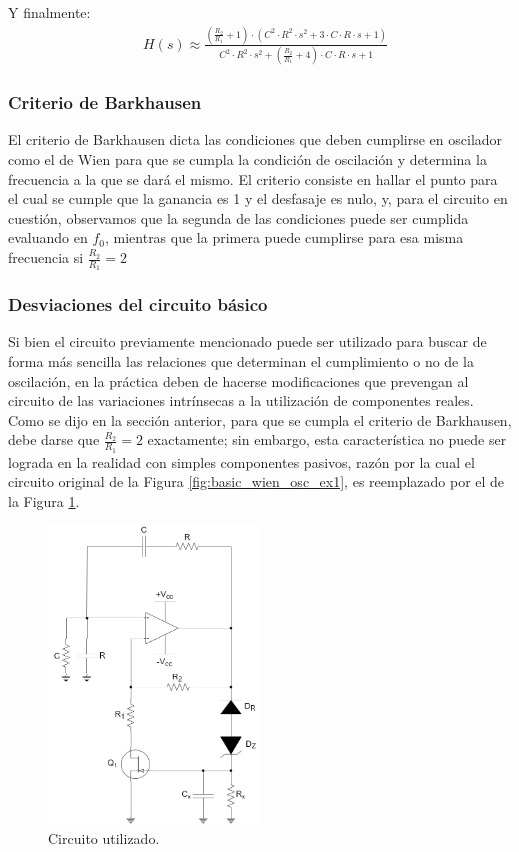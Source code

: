 Y finalmente:
\begin{align}
    & H(s) \approx \frac{\left(\frac{R_2}{R_1} + 1\right) \cdot \left(C^2 \cdot R^2 \cdot s^2 + 3 \cdot C \cdot R \cdot s + 1\right)}
    {C^2 \cdot R^2 \cdot s^2 + \left(\frac{R_2}{R_1} + 4\right) \cdot C \cdot R \cdot s + 1}
    \label{eq:transference_ex1}
\end{align}


\subsubsection{Criterio de Barkhausen}
El criterio de Barkhausen dicta las condiciones que deben cumplirse en oscilador como el de Wien para que se cumpla la condición de oscilación y determina la frecuencia a 
la que se dará el mismo.
El criterio consiste en hallar el punto para el cual se cumple que la ganancia es 1 y el desfasaje es nulo, y, para el circuito en cuestión, observamos que la segunda de 
las condiciones puede ser cumplida evaluando en $f_0$, mientras que la primera puede cumplirse para esa misma frecuencia si $\frac{R_2}{R_1} = 2$


\subsubsection{Desviaciones del circuito básico}
Si bien el circuito previamente mencionado puede ser utilizado para buscar de forma más sencilla las relaciones que determinan el cumplimiento o no de la oscilación, en 
la práctica deben de hacerse modificaciones que prevengan al circuito de las variaciones intrínsecas a la utilización de componentes reales.
Como se dijo en la sección anterior, para que se cumpla el criterio de Barkhausen, debe darse que $\frac{R_2}{R_1} = 2$ exactamente; sin embargo, esta característica no 
puede ser lograda en la realidad con simples componentes pasivos, razón por la cual el circuito original de la Figura \ref{fig:basic_wien_osc_ex1}, es reemplazado por el 
de la Figura \ref{fig:wein_osc_circuit_ex1}.
\begin{figure}[H]
    \centering
    \includegraphics[width=0.5\textwidth]{../EJ1/Recursos/wein_osc_circuit.jpg}
    \caption{Circuito utilizado.}
    \label{fig:wein_osc_circuit_ex1}    
\end{figure}

